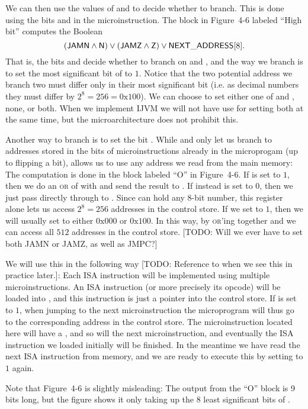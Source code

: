 \documentclass[article, a4paper, 11pt, oneside]{memoir}
\numberwithin{equation}{chapter}
\newcommand{\gate}{\textsc}
\newcommand{\gateOR}{\gate{or}}
\begin{document}
\begin{notelist}
\newcommand{\hex}[1]{\ensuremath{\mathrm{0x#1}}}

We can then use the values of  and  to decide whether to branch. This is done using the bits  and  in the microinstruction. The block in Figure~4-6 labeled \enquote{High bit} computes the Boolean
%
\begin{equation*}
    (\mathsf{JAMN} \land \mathsf{N}) \lor (\mathsf{JAMZ} \land \mathsf{Z}) \lor \mathsf{NEXT\_ADDRESS}[8].
\end{equation*}
%
That is, the bits  and  decide whether to branch on  and , and the way we branch is to set the most significant bit of  to $1$. Notice that the two potential address we branch two must differ only in their most significant bit (i.e. as decimal numbers they must differ by $2^8 = 256 = \hex{100}$). We can choose to set either one of  and , none, or both. When we implement IJVM we will not have use for setting both at the same time, but the microarchitecture does not prohibit this.

Another way to branch is to set the bit . While  and  only let us branch to addresses stored in the  bits of microinstructions already in the microprogam (up to flipping a bit),  allows us to use any address we read from the main memory: The computation is done in the block labeled \enquote{O} in Figure~4-6. If  is set to $1$, then we do an \gateOR{} of  with  and send the result to . If instead  is set to $0$, then we just pass  directly through to . Since  can hold any 8-bit number, this register alone lets us access $2^8 = 256$ addresses in the control store. If we set  to $1$, then we will usually set  to either \hex{000} or \hex{100}. In this way, by \gateOR{}'ing together  and  we can access all $512$ addresses in the control store. [TODO: Will we ever have to set both JAMN or JAMZ, as well as JMPC?]

We will use this in the following way [TODO: Reference to when we see this in practice later.]: Each ISA instruction will be implemented using multiple microinstructions. An ISA instruction (or more precisely its opcode) will be loaded into , and this instruction is just a pointer into the control store. If  is set to $1$, when jumping to the next microinstruction the microprogram will thus go to the corresponding address in the control store. The microinstruction located here will have a , and so will the next microinstruction, and eventually the ISA instruction we loaded initially will be finished. In the meantime we have read the next ISA instruction from memory, and we are ready to execute this by setting  to $1$ again.

Note that Figure~4-6 is slightly misleading: The output from the \enquote{O} block is 9 bits long, but the figure shows it only taking up the 8 least significant bits of .
\end{notelist}
\end{document}
